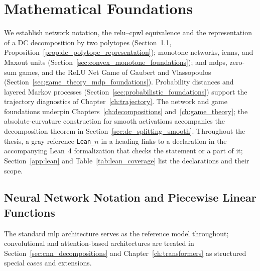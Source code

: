 \chapter{Mathematical Foundations}\label{ch:foundations}

We establish network notation, the \ac{relu}--\ac{cpwl} equivalence and the representation of a DC decomposition by two polytopes (Section~\ref{sec:nn_notation_pwl}, Proposition~\ref{prop:dc_polytope_representation}); monotone networks, \acp{icnn}, and Maxout units (Section~\ref{sec:convex_monotone_foundations}); and \acp{mdp}, zero-sum games, and the ReLU Net Game of Gaubert and Vlassopoulos (Section~\ref{sec:game_theory_mdp_foundations}). Probability distances and layered Markov processes (Section~\ref{sec:probabilistic_foundations}) support the trajectory diagnostics of Chapter~\ref{ch:trajectory}. The network and game foundations underpin Chapters~\ref{ch:decompositions} and~\ref{ch:game_theory}; the absolute-curvature construction for smooth activations accompanies the decomposition theorem in Section~\ref{sec:dc_splitting_smooth}. Throughout the thesis, a gray reference \texttt{Lean\_$n$} in a heading links to a declaration in the accompanying Lean~4 formalization that checks the statement or a part of it; Section~\ref{app:lean} and Table~\ref{tab:lean_coverage} list the declarations and their scope.

\section{Neural Network Notation and Piecewise Linear Functions}\label{sec:nn_notation_pwl}

The standard \ac{mlp} architecture serves as the reference model throughout; convolutional and attention-based architectures are treated in Section~\ref{sec:cnn_decompositions} and Chapter~\ref{ch:transformers} as structured special cases and extensions.

